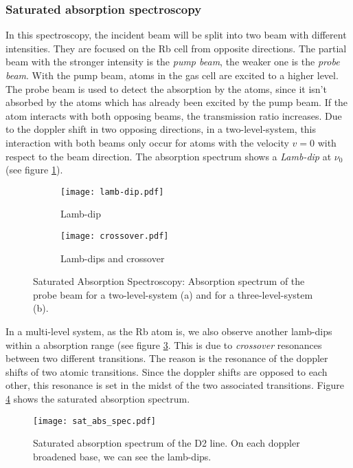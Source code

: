 \subsubsection{Saturated absorption spectroscopy}
In this spectroscopy, the incident beam will be split into two beam with different intensities. They are focused on the Rb cell from opposite directions. The partial beam with the stronger intensity is the \emph{pump beam}, the weaker one is the \emph{probe beam}. With the pump beam, atoms in the gas cell are excited to a higher level. The probe beam is used to detect the absorption by the atoms, since it isn't absorbed by the atoms which has already been excited by the pump beam. If the atom interacts with both opposing beams, the transmission ratio increases. Due to the doppler shift in two opposing directions, in a two-level-system, this interaction with both beams only occur for atoms with the velocity $v=0$ with respect to the beam direction. The absorption spectrum shows a \emph{Lamb-dip} at $\nu_0$ (see figure \ref{fig:lamb-dip}).
\begin{figure}[h]
	\centering
	\begin{subfigure}{0.45\textwidth}
		\centering
		\texttt{[image: lamb-dip.pdf]}
		\caption{Lamb-dip}
		\label{fig:lamb-dip}
	\end{subfigure}
	\hfill
	\begin{subfigure}{0.45\textwidth}
		\centering
		\texttt{[image: crossover.pdf]}
		\caption{Lamb-dips and crossover}
		\label{fig:crossover}
	\end{subfigure}
	\caption{Saturated Absorption Spectroscopy: Absorption spectrum of the probe beam for a two-level-system (a) and for a three-level-system (b).}
\end{figure}
In a multi-level system, as the Rb atom is, we also observe another lamb-dips within a absorption range (see figure \ref{fig:crossover}. This is due to \emph{crossover} resonances between two different transitions. The reason is the resonance of the doppler shifts of two atomic transitions. Since the doppler shifts are opposed to each other, this resonance is set in the midst of the two associated transitions.
Figure \ref{fig:sat_abs_spec} shows the saturated absorption spectrum.
\begin{figure}[h]
	\centering
	\texttt{[image: sat\_abs\_spec.pdf]}
	\caption{Saturated absorption spectrum of the D2 line. On each doppler broadened base, we can see the lamb-dips. \cite{lit:AK_manual2012}}
	\label{fig:sat_abs_spec}
\end{figure}
